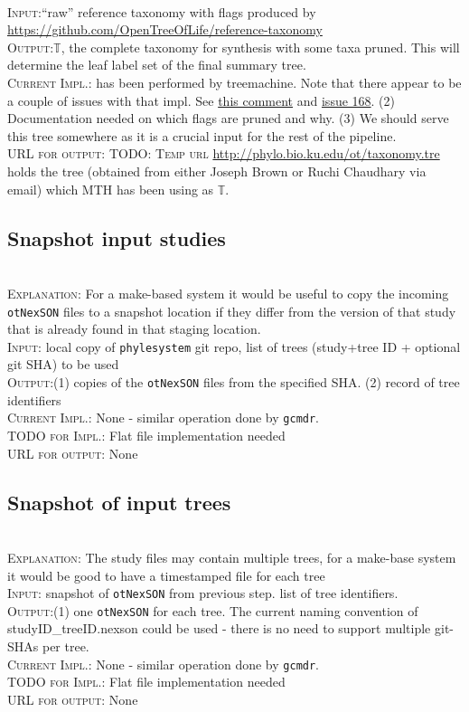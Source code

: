 \documentclass[11pt]{article}
\newcommand{\nexson}[0]{\texttt{otNexSON}\xspace}
\newcommand{\gcmdr}[0]{\texttt{gcmdr}\xspace}
\newcommand{\stepExplanation}[0]{\\\noindent\textsc{Explanation}:\xspace}
\newcommand{\stepInput}[0]{\\\noindent\textsc{Input}:\xspace}
\newcommand{\stepOutput}[0]{\\\noindent\textsc{Output}:\xspace}
\newcommand{\currImpl}[0]{\\\noindent\textsc{Current Impl.}:\xspace}
\newcommand{\implTODO}[0]{\\\noindent\textsc{TODO for Impl.}:\xspace}
\newcommand{\currURL}[0]{\\\noindent\textsc{URL for output}:\xspace}
\newcommand{\comment}[1]{{\color{red} \textsc{#1}}\xspace}
\newcommand{\TODO}[1]{\comment{TODO: #1}}
\newcommand{\taxonomy}[0]{\ensuremath{\mathbb{T}}\xspace}
\begin{document}
\stepInput ``raw'' reference taxonomy with flags produced by \url{https://github.com/OpenTreeOfLife/reference-taxonomy}
\stepOutput $\taxonomy$, the complete taxonomy for synthesis with some taxa pruned.
This will determine the leaf label set of the final summary tree.
\currImpl has been performed by treemachine. Note that there appear to be
    a couple of issues with that impl. See 
\href{https://github.com/OpenTreeOfLife/treemachine/commit/48211803f137ad0b7c096c28d1c10d32f671194f}{this comment} and
\href{https://github.com/OpenTreeOfLife/treemachine/issues/168}{issue 168}.
(2) Documentation needed on which flags are pruned and why.
(3) We should serve this tree somewhere as it is a crucial input for the rest of the pipeline.
\currURL \TODO{Temp url} \url{http://phylo.bio.ku.edu/ot/taxonomy.tre} holds the tree (obtained
    from either Joseph Brown or Ruchi Chaudhary via email) which MTH has been using as \taxonomy.

\subsection{Snapshot input studies}
\stepExplanation For a make-based system it would be useful to copy the incoming \nexson files
    to a snapshot location if they differ from the version of that study that is already found
    in that staging location.
\stepInput local copy of \texttt{phylesystem} git repo, list of trees (study+tree ID + optional git SHA) to be used
\stepOutput (1) copies of the \nexson files from the specified SHA. (2) record of tree identifiers
\currImpl None - similar operation done by \gcmdr.
\implTODO Flat file implementation needed
\currURL None
 
\subsection{Snapshot of input trees}
\stepExplanation The study files may contain multiple trees, for a make-base system it would
    be good to have a timestamped file for each tree
\stepInput snapshot of \nexson from previous step. list of tree identifiers.
\stepOutput (1) one \nexson for each tree. The current naming convention of studyID\_treeID.nexson could
    be used - there is no need to support multiple git-SHAs per tree.
\currImpl None - similar operation done by \gcmdr.
\implTODO Flat file implementation needed
\currURL None
 
\end{document}

